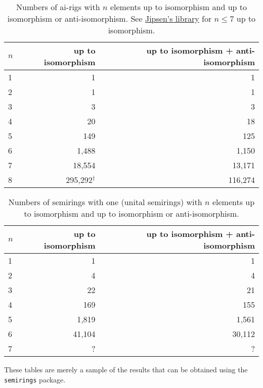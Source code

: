 \documentclass{article}
\theoremstyle{definition}
\begin{document}
\begin{table}[ht]
    \centering
    \begin{tabular}{l|r|r}
      \toprule
      $n$ & up to isomorphism & up to isomorphism + anti-isomorphism \\
      \midrule
      1 & 1         & 1      \\
      2 & 1         & 1      \\
      3 & 3         & 3      \\
      4 & 20        & 18     \\
      5 & 149       & 125    \\
      6 & 1,488     & 1,150  \\
      7 & 18,554    & 13,171 \\
      8 & 295,292$^\dagger$   & 116,274      \\
    \end{tabular}
    \caption{Numbers of ai-rigs with $n$ elements up to isomorphism and up
    to isomorphism or anti-isomorphism. See \href{https://math.chapman.edu/~jipsen/structures/doku.php?id=idempotent_semirings_with_identity_and_zero\#finite_members}{Jipsen's library} for \(n\leq7\) up to isomorphism.}
    \label{tab:ai-rigs}
\end{table}

\begin{table}[h]
    \centering
    \begin{tabular}{l|r|r}
      \toprule
      $n$ & up to isomorphism & up to isomorphism + anti-isomorphism \\
      \midrule
      1 & 1         & 1      \\
      2 & 4         & 4      \\
      3 & 22        & 21     \\
      4 & 169       & 155    \\
      5 & 1,819     & 1,561  \\
      6 & 41,104    & 30,112 \\
      7 & ?         & ?      \\
    \end{tabular}
    \caption{Numbers of semirings with one (unital semirings) with $n$ elements up to isomorphism and up to isomorphism or anti-isomorphism.}
    \label{tab:unital-semirings}
\end{table}

These tables are merely a sample of the results that can be obtained using the \texttt{semirings} package.
\end{document}
